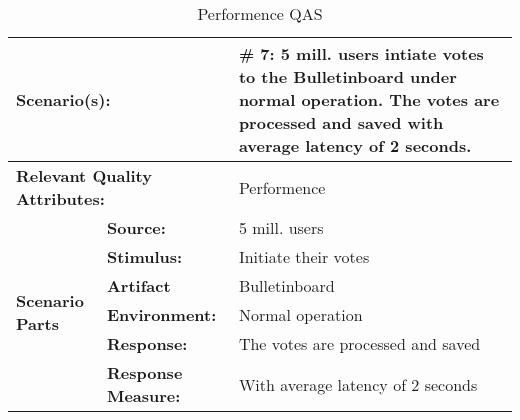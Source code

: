 \begin{table}[H]
\begin{center}
\begin{tabular}{|p{0.3cm}|p{2.5cm}|p{8cm}|}
  \hline
  \multicolumn{2}{|p{3cm}|}{\bfseries Scenario(s):} & \#  7: 5 mill. users intiate votes to the Bulletinboard under normal operation. The votes are processed and saved with average latency of 2 seconds.\\
  \hline
  \multicolumn{2}{|p{3cm}|}{\bfseries Relevant Quality Attributes:} & Performence\\
  \hline
  \multirow{6}{*}{\begin{sideways}{\bfseries Scenario Parts}\end{sideways}}
  & {\bfseries Source:} & 5 mill. users \\
  \cline{2-3}
  & {\bfseries Stimulus:} & Initiate their votes \\
  \cline{2-3}
  & {\bfseries Artifact} &  Bulletinboard \\
  \cline{2-3}
  & {\bfseries Environment:} &  Normal operation \\
  \cline{2-3}
  & {\bfseries Response:} &  The votes are processed and saved\\
  \cline{2-3}
  & {\bfseries Response Measure:} &  With average latency of 2 seconds\\
  \hline
\end{tabular}
\caption{Performence QAS}
\end{center}
\end{table}



